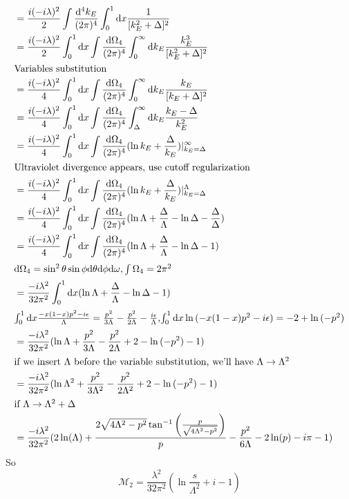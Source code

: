 \documentclass{article}
\begin{document}
\begin{enumerate}[(i)]
\begin{align*}
    &=\frac{i(-i\lambda)^2}{2}\int\frac{\dd^4k_E}{(2\pi)^4}\int^1_0\dd x\frac{1}{[k_E^2+\Delta]^2}\\
    &=\frac{i(-i\lambda)^2}{2}\int^1_0\dd x\int\frac{\dd\Omega_4}{(2\pi)^4}\int^{\infty}_0\dd k_E\frac{k_E^3}{[k_E^2+\Delta]^2}\\\intertext{Variables substitution}
    &=\frac{i(-i\lambda)^2}{4}\int^1_0\dd x\int\frac{\dd\Omega_4}{(2\pi)^4}\int^{\infty}_0\dd k_E\frac{k_E}{[k_E+\Delta]^2}\\
    &=\frac{i(-i\lambda)^2}{4}\int^1_0\dd x\int\frac{\dd\Omega_4}{(2\pi)^4}\int^{\infty}_{\Delta}\dd k_E\frac{k_E-\Delta}{k_E^2}\\
    &=\frac{i(-i\lambda)^2}{4}\int^1_0\dd x\int\frac{\dd\Omega_4}{(2\pi)^4}(\ln{k_E}+\frac{\Delta}{k_E})|_{k_E=\Delta}^{\infty}\\\intertext{Ultraviolet divergence appears, use cutoff regularization}
    &=\frac{i(-i\lambda)^2}{4}\int^1_0\dd x\int\frac{\dd\Omega_4}{(2\pi)^4}(\ln{k_E}+\frac{\Delta}{k_E})|_{k_E=\Delta}^{\Lambda}\\
    &=\frac{i(-i\lambda)^2}{4}\int^1_0\dd x\int\frac{\dd\Omega_4}{(2\pi)^4}(\ln{\Lambda}+\frac{\Delta}{\Lambda}-\ln{\Delta}-\frac{\Delta}{\Delta})\\
    &=\frac{i(-i\lambda)^2}{4}\int^1_0\dd x\int\frac{\dd\Omega_4}{(2\pi)^4}(\ln{\Lambda}+\frac{\Delta}{\Lambda}-\ln{\Delta}-1)\\\intertext{$\dd\Omega_4=\sin^2\theta\sin\phi\dd\theta\dd\phi\dd\omega,\int\Omega_4=2\pi^2$}
    &=\frac{-i\lambda^2}{32\pi^2}\int^1_0\dd x(\ln{\Lambda}+\frac{\Delta}{\Lambda}-\ln{\Delta}-1)\\\intertext{$\int_0^1\dd x\frac{-x(1-x)p^2-i\epsilon}{\Lambda}=\frac{p^2}{3\Lambda}-\frac{p^2}{2\Lambda}-\frac{i\epsilon}{\Lambda}$,$\int_0^1\dd x\ln{(-x(1-x)p^2-i\epsilon)}=-2+\ln{(-p^2)}$}
    &=\frac{-i\lambda^2}{32\pi^2}(\ln{\Lambda}+\frac{p^2}{3\Lambda}-\frac{p^2}{2\Lambda}+2-\ln{(-p^2)}-1)\\\intertext{if we insert $\Lambda$ before the variable substitution, we'll have $\Lambda\rightarrow\Lambda^2$}
    &=\frac{-i\lambda^2}{32\pi^2}(\ln{\Lambda^2}+\frac{p^2}{3\Lambda^2}-\frac{p^2}{2\Lambda^2}+2-\ln{(-p^2)}-1)\\\intertext{if $\Lambda\rightarrow\Lambda^2+\Delta$}
    &=\frac{-i\lambda^2}{32\pi^2}(2 \ln (\Lambda )+\frac{2 \sqrt{4 \Lambda ^2-p^2} \tan ^{-1}\left(\frac{p}{\sqrt{4 \Lambda ^2-p^2}}\right)}{p}-\frac{p^2}{6 \Lambda }-2 \ln (p)-i \pi -1)
  \end{align*}
  So
  $$\mathcal{M}_2=\frac{\lambda^2}{32\pi^2}(\ln{\frac{s}{\Lambda^2}}+i-1)$$

\end{enumerate}
\end{document}
